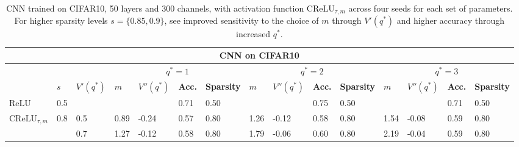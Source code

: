 \documentclass{article}
\theoremstyle{plain}
\theoremstyle{definition}
\theoremstyle{remark}
\begin{document}
\begin{table}[ht!]
\centering
\tiny
\caption{CNN trained on CIFAR10, 50 layers and 300 channels, with activation function $\text{CReLU}_{\tau, m}$ across four seeds for each set of parameters. For higher sparsity levels $s=\{0.85, 0.9\}$, see improved sensitivity to the choice of $m$ through $V'(q^*)$ and higher accuracy through increased $q^*$. 
}
\begin{tabular}
{p{0.75cm}p{0.3cm}p{0.6cm}|p{0.3cm}p{0.65cm}|p{0.4cm}p{0.6cm}|p{0.3cm}p{0.65cm}|p{0.4cm}p{0.6cm}|p{0.3cm}p{0.65cm}|p{0.4cm}p{0.6cm}}
\toprule
\multicolumn{15}{c}{\textbf{CNN on CIFAR10}} \\ 
\midrule
 &   & & \multicolumn{4}{|c|}{$q^*=1$} & \multicolumn{4}{|c|}{$q^*=2$} & \multicolumn{4}{|c}{$q^*=3$} \\
\midrule
  & $s$ & $V'(q^*)$  & 
 $m$ & $V''(q^*)$  &\textbf{Acc.} & \textbf{Sparsity} & $m$ & $V''(q^*)$ &\textbf{Acc.} & \textbf{Sparsity} & $m$ & $V''(q^*)$ &\textbf{Acc.} & \textbf{Sparsity} \\ 
\midrule
\multirow{1}{*}{$\text{ReLU}$}  &0.5& &&& 0.71& 0.50&&&0.75&0.50&&&0.71&0.50\\
\midrule
 \multirow{7}{*}{$\text{CReLU}_{\tau, m}$} 
&0.8& 0.5 & 0.89 & -0.24  & 0.57 & 0.80 & 1.26 & -0.12  & 0.58 & 0.80   & 1.54 & -0.08  & 0.59  & 0.80  \\
 \rowcolor{lightgray}\cellcolor{white}&\cellcolor{white}&0.7 & 1.27 & -0.12  & 0.58 & 0.80 & 1.79 & -0.06   & 0.60& 0.80   & 2.19 & -0.04  & 0.59  & 0.80  \\
 

\end{tabular}
\end{table}
\end{document}
